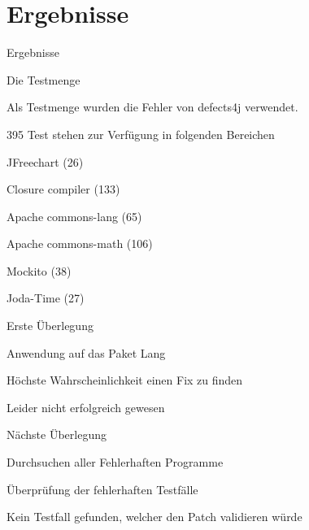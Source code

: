 \section{Ergebnisse}
%
\begin{frame}{}
	\begin{center}
		\huge{Ergebnisse}
	\end{center}
\end{frame}
%
\begin{frame}{Die Testmenge}
	\begin{itemizes}{1em}
		\item Als Testmenge wurden die Fehler von defects4j verwendet.
		\item 395 Test stehen zur Verfügung in folgenden Bereichen
		\begin{itemizes}{0.3em}
			\item JFreechart (26)
			\item Closure compiler (133)
			\item Apache commons-lang (65)
			\item Apache commons-math (106)
			\item Mockito (38)
			\item Joda-Time (27)
		\end{itemizes}
	\end{itemizes}
\end{frame}
%
\begin{frame}{}
\end{frame}
%
\begin{frame}{Erste Überlegung}
	\begin{itemizes}{1em}
		\item Anwendung auf das Paket Lang
		\item Höchste Wahrscheinlichkeit einen Fix zu finden
		\item Leider nicht erfolgreich gewesen
	\end{itemizes}
\end{frame}
%
\begin{frame}{Nächste Überlegung}
\begin{itemizes}{1em}
	\item Durchsuchen aller Fehlerhaften Programme
	\item Überprüfung der fehlerhaften Testfälle
	\item Kein Testfall gefunden, welcher den Patch validieren würde
\end{itemizes}
\end{frame}
